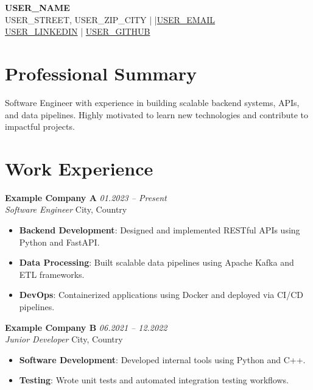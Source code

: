 \documentclass[10pt,a4paper]{article}
\begin{document}
\pagestyle{empty}

\begin{center}
  {\LARGE\bfseries {{USER_NAME}}}\\[4pt]
  {{USER_STREET}}, {{USER_ZIP_CITY}}
  \quad|
  \quad|\quad \href{mailto:{{USER_EMAIL}}}{{{USER_EMAIL}}}\\[2pt]
  \href{https://{{USER_LINKEDIN}}}{{{USER_LINKEDIN}}}
  \quad|\quad
  \href{https://{{USER_GITHUB}}}{{{USER_GITHUB}}}
\end{center}
\vspace{2pt}

\section{Professional Summary}
Software Engineer with experience in building scalable backend systems, APIs, and data pipelines. 
Highly motivated to learn new technologies and contribute to impactful projects.

\vspace{4pt}

\section{Work Experience}

\textbf{Example Company A} \hfill \textit{01.2023 -- Present}\\
\textit{Software Engineer} \hfill City, Country\\[2pt]
\begin{itemize}
  \item \textbf{Backend Development}: Designed and implemented RESTful APIs using Python and FastAPI.
  \item \textbf{Data Processing}: Built scalable data pipelines using Apache Kafka and ETL frameworks.
  \item \textbf{DevOps}: Containerized applications using Docker and deployed via CI/CD pipelines.
\end{itemize}
\vspace{4pt}

\textbf{Example Company B} \hfill \textit{06.2021 -- 12.2022}\\
\textit{Junior Developer} \hfill City, Country\\[2pt]
\begin{itemize}
  \item \textbf{Software Development}: Developed internal tools using Python and C++.
  \item \textbf{Testing}: Wrote unit tests and automated integration testing workflows.
\end{itemize}
\end{document}
